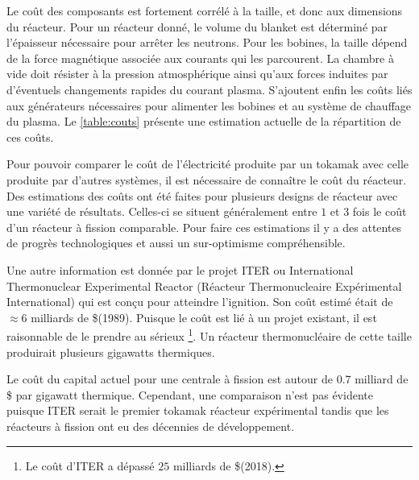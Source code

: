\documentclass[main.tex]{subfiles}
\begin{document}
\begin{table}


\label{table:couts}
\end{table}

Le coût des composants est fortement corrélé à la taille, et donc aux dimensions du réacteur.
Pour un réacteur donné, le volume du blanket est déterminé par l’épaisseur nécessaire pour arrêter les neutrons.
Pour les bobines, la taille dépend de la force magnétique associée aux courants qui les parcourent.
La chambre à vide doit résister à la pression atmosphérique ainsi qu’aux forces induites par d’éventuels changements rapides du courant plasma.
S’ajoutent enfin les coûts liés aux générateurs nécessaires pour alimenter les bobines et au système de chauffage du plasma.
Le \autoref{table:couts} présente une estimation actuelle de la répartition de ces coûts.

Pour pouvoir comparer le coût de l'électricité produite par un tokamak avec celle produite par d'autres systèmes, il est nécessaire de connaître le coût du réacteur.
Des estimations des coûts ont été faites pour plusieurs designs de réacteur avec une variété de résultats.
Celles-ci se situent généralement entre \( 1 \) et \( 3 \) fois le coût d'un  réacteur à fission comparable.
Pour faire ces estimations il y a des attentes de progrès technologiques et aussi un sur-optimisme compréhensible.

Une autre information est donnée par le projet ITER ou International Thermonuclear Experimental Reactor (Réacteur Thermonucleaire Expérimental International) qui est conçu pour atteindre l'ignition.
Son coût estimé était de \( \approx 6 \) milliards de \$(1989).
Puisque le coût est lié à un projet existant, il est raisonnable de le prendre au sérieux \footnote{Le coût d'ITER a dépassé \( 25 \) milliards de \$(2018).}.
Un réacteur thermonucléaire de cette taille produirait plusieurs gigawatts thermiques.

Le coût du capital actuel pour une centrale à fission est autour de 0.7 milliard de \$ par gigawatt thermique.
Cependant, une comparaison n'est pas évidente puisque ITER serait le premier tokamak réacteur expérimental tandis que les réacteurs à fission ont eu des décennies de développement.
\end{document}
